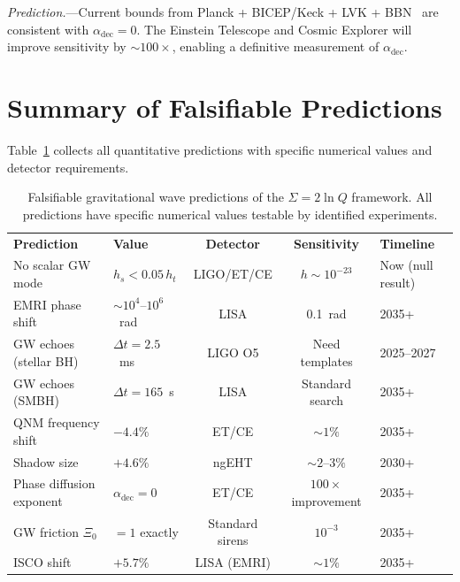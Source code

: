 \documentclass[prl,twocolumn,superscriptaddress,longbibliography]{revtex4-2}
\begin{document}
\emph{Prediction.}---Current bounds from
Planck + BICEP/Keck + LVK + BBN~\cite{deKruijf2025} are
consistent with $\alpha_{\mathrm{dec}} = 0$.  The Einstein
Telescope and Cosmic Explorer will improve sensitivity by
$\sim 100\times$, enabling a definitive measurement of
$\alpha_{\mathrm{dec}}$.

\section{Summary of Falsifiable Predictions}
\label{sec:summary}

Table~\ref{tab:summary} collects all quantitative predictions
with specific numerical values and detector requirements.

\begin{table}[t]
\caption{\label{tab:summary}%
Falsifiable gravitational wave predictions of the
$\Sigma = 2\ln Q$ framework.  All predictions have specific
numerical values testable by identified experiments.}
\begin{ruledtabular}
\begin{tabular}{llccl}
  \textbf{Prediction} & \textbf{Value} & \textbf{Detector}
    & \textbf{Sensitivity} & \textbf{Timeline} \\
  \colrule
  No scalar GW mode & $h_s < 0.05\,h_t$ & LIGO/ET/CE
    & $h \sim 10^{-23}$ & Now (null result) \\
  EMRI phase shift & $\sim 10^4$--$10^6$~rad & LISA
    & 0.1~rad & 2035+ \\
  GW echoes (stellar BH) & $\Delta t = 2.5$~ms
    & LIGO O5 & Need templates & 2025--2027 \\
  GW echoes (SMBH) & $\Delta t = 165$~s
    & LISA & Standard search & 2035+ \\
  QNM frequency shift & $-4.4\%$
    & ET/CE & $\sim 1\%$ & 2035+ \\
  Shadow size & $+4.6\%$ & ngEHT & $\sim 2$--$3\%$ & 2030+ \\
  Phase diffusion exponent & $\alpha_{\mathrm{dec}} = 0$
    & ET/CE & $100\times$ improvement & 2035+ \\
  GW friction $\Xi_0$ & $= 1$ exactly
    & Standard sirens & $10^{-3}$ & 2035+ \\
  ISCO shift & $+5.7\%$ & LISA (EMRI) & $\sim 1\%$ & 2035+ \\
\end{tabular}
\end{ruledtabular}
\end{table}
\end{document}
